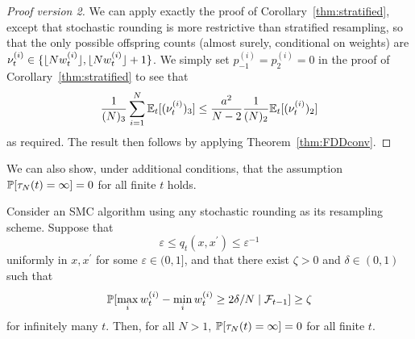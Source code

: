 
\begin{proof}[Proof version 2]
We can apply exactly the proof of Corollary~\ref{thm:stratified}, except that stochastic rounding is more restrictive than stratified resampling, so that the only possible offspring counts (almost surely, conditional on weights) are $\nu_t^{(i)} \in \{ \lfloor N w_t^{(i)} \rfloor, \lfloor N w_t^{(i)} \rfloor +1 \}$. We simply set $p_{-1}^{(i)} = p_{2}^{(i)} = 0$ in the proof of Corollary~\ref{thm:stratified} to see that
\begin{equation*}
\frac{1}{(N)_3} \sum_{i=1}^{N} \mathbb{E}_t [(\nu_t^{(i)})_3 ]
\leq \frac{a^2}{N-2} \frac{1}{(N)_2} \mathbb{E}_t [(\nu_t^{(i)})_2 ]
\end{equation*}
as required.
The result then follows by applying Theorem~\ref{thm:FDDconv}.
\end{proof}


We can also show, under additional conditions, that the assumption $\mathbb{P}[ \tau_N(t) = \infty ] =0$ for all finite $t$ holds.

\begin{lemma}\label{thm:SR_nontriviality}
Consider an SMC algorithm using any stochastic rounding as its resampling scheme.
Suppose that 
\begin{equation*}
\varepsilon \leq q_t(x, x^\prime) \leq \varepsilon^{-1}
\end{equation*}
uniformly in $x,x^\prime$ for some $\varepsilon \in (0,1]$, and that there exist $\zeta >0$ and $\delta \in (0,1)$ such that 
\begin{equation*}
\mathbb{P}[ \max_i w_t^{(i)} - \min_i w_t^{(i)} \geq 2\delta/N \mid \mathcal{F}_{t-1} ] \geq \zeta
\end{equation*}
 for infinitely many $t$. Then, for all $N>1$, $\mathbb{P}[ \tau_N(t) = \infty ] =0$ for all finite $t$.
\end{lemma}

